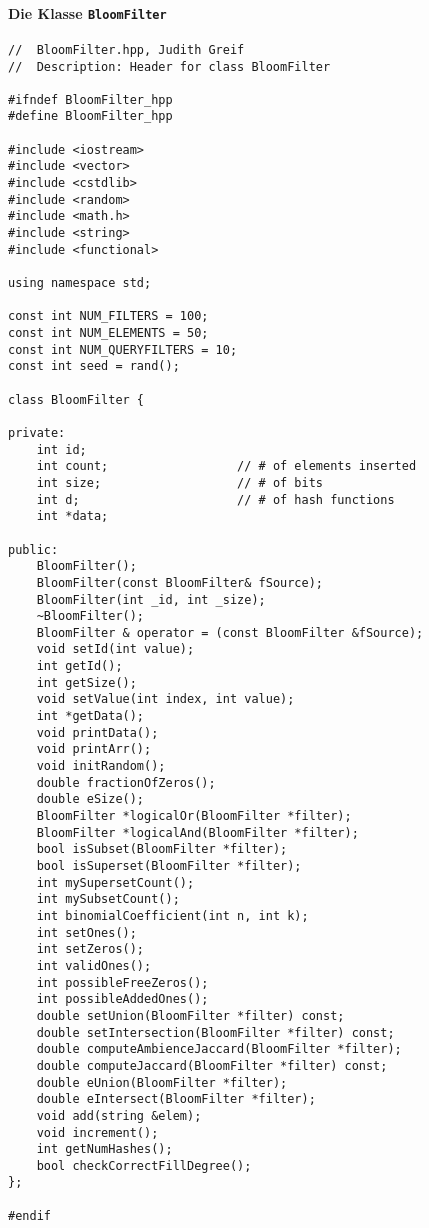 \paragraph*{Die Klasse \texttt{BloomFilter}}
\small{
\begin{verbatim}
//  BloomFilter.hpp, Judith Greif
//  Description: Header for class BloomFilter

#ifndef BloomFilter_hpp
#define BloomFilter_hpp

#include <iostream>
#include <vector>
#include <cstdlib>
#include <random>
#include <math.h>
#include <string>
#include <functional>

using namespace std;

const int NUM_FILTERS = 100;
const int NUM_ELEMENTS = 50;
const int NUM_QUERYFILTERS = 10;
const int seed = rand();

class BloomFilter {
    
private:
    int id;
    int count;                  // # of elements inserted
    int size;                   // # of bits
    int d;                      // # of hash functions
    int *data;
    
public:
    BloomFilter();
    BloomFilter(const BloomFilter& fSource);
    BloomFilter(int _id, int _size);
    ~BloomFilter();   
    BloomFilter & operator = (const BloomFilter &fSource);   
    void setId(int value);
    int getId();
    int getSize();
    void setValue(int index, int value);
    int *getData();   
    void printData();
    void printArr();
    void initRandom();
    double fractionOfZeros();
    double eSize();
    BloomFilter *logicalOr(BloomFilter *filter);
    BloomFilter *logicalAnd(BloomFilter *filter);
    bool isSubset(BloomFilter *filter);
    bool isSuperset(BloomFilter *filter);
    int mySupersetCount();
    int mySubsetCount();
    int binomialCoefficient(int n, int k);
    int setOnes();
    int setZeros();
    int validOnes();
    int possibleFreeZeros();
    int possibleAddedOnes();
    double setUnion(BloomFilter *filter) const;
    double setIntersection(BloomFilter *filter) const;
    double computeAmbienceJaccard(BloomFilter *filter);
    double computeJaccard(BloomFilter *filter) const;
    double eUnion(BloomFilter *filter);
    double eIntersect(BloomFilter *filter);
    void add(string &elem);
    void increment();
    int getNumHashes();
    bool checkCorrectFillDegree();
};

#endif
\end{verbatim}
}
